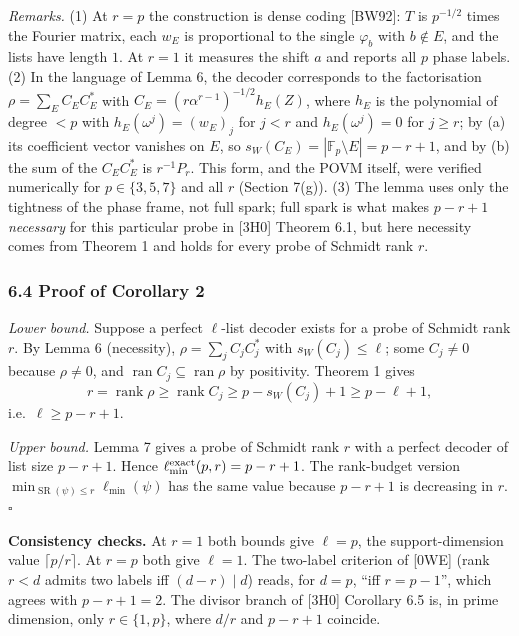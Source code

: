 \documentclass[
  11pt,
  a4paper,
]{article}
\begin{document}
\emph{Remarks.} (1) At \(r=p\) the construction is dense coding
{[}BW92{]}: \(T\) is \(p^{-1/2}\) times the Fourier matrix, each \(w_E\)
is proportional to the single \(\varphi_b\) with \(b\notin E\), and the
lists have length \(1\). At \(r=1\) it measures the shift \(a\) and
reports all \(p\) phase labels. (2) In the language of Lemma 6, the
decoder corresponds to the factorisation \(\rho=\sum_EC_EC_E^*\) with
\(C_E=(r\alpha^{r-1})^{-1/2}h_E(Z)\), where \(h_E\) is the polynomial of
degree \(<p\) with \(h_E(\omega^j)=(w_E)_j\) for \(j<r\) and
\(h_E(\omega^j)=0\) for \(j\ge r\); by (a) its coefficient vector
vanishes on \(E\), so \(s_W(C_E)=|\mathbb F_p\setminus E|=p-r+1\), and
by (b) the sum of the \(C_EC_E^*\) is \(r^{-1}P_r\). This form, and the
POVM itself, were verified numerically for \(p\in\{3,\allowbreak{}5,\allowbreak{}7\}\) and all
\(r\) (Section 7(g)). (3) The lemma uses only the tightness of the phase
frame, not full spark; full spark is what makes \(p-r+1\)
\emph{necessary} for this particular probe in {[}3H0{]} Theorem 6.1, but
here necessity comes from Theorem 1 and holds for every probe of Schmidt
rank \(r\).

\subsubsection{6.4 Proof of Corollary 2}\label{proof-of-corollary-2}

\emph{Lower bound.} Suppose a perfect \(\ell\)-list decoder exists for a
probe of Schmidt rank \(r\). By Lemma 6 (necessity),
\(\rho=\sum_jC_jC_j^*\) with \(s_W(C_j)\le\ell\); some \(C_j\ne0\)
because \(\rho\ne0\), and
\(\operatorname{ran}C_j\subseteq\operatorname{ran}\rho\) by positivity.
Theorem 1 gives
\[r=\operatorname{rank}\rho\ge\operatorname{rank}C_j\ge p-s_W(C_j)+1\ge p-\ell+1,\]
i.e.~\(\ell\ge p-r+1\).

\emph{Upper bound.} Lemma 7 gives a probe of Schmidt rank \(r\) with a
perfect decoder of list size \(p-r+1\). Hence
\(\ell^{\rm exact}_{\min}(p,\allowbreak{}r)=p-r+1\). The rank-budget version
\(\min_{\operatorname{SR}(\psi)\le r}\ell_{\min}(\psi)\) has the same
value because \(p-r+1\) is decreasing in \(r\). \(\square\)

\textbf{Consistency checks.} At \(r=1\) both bounds give \(\ell=p\), the
support-dimension value \(\lceil p/r\rceil\). At \(r=p\) both give
\(\ell=1\). The two-label criterion of {[}0WE{]} (rank \(r<d\) admits
two labels iff \((d-r)\mid d\)) reads, for \(d=p\), ``iff \(r=p-1\)'',
which agrees with \(p-r+1=2\). The divisor branch of {[}3H0{]} Corollary
6.5 is, in prime dimension, only \(r\in\{1,\allowbreak{}p\}\), where \(d/r\) and
\(p-r+1\) coincide.
\end{document}

